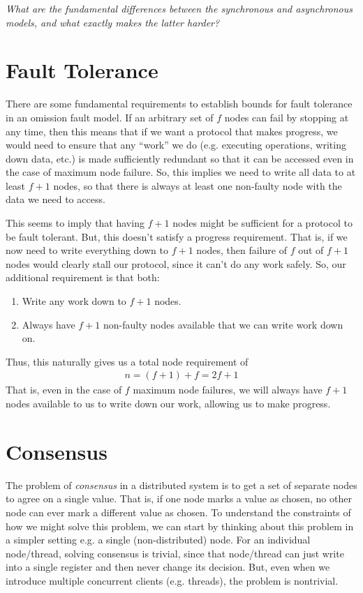 \documentclass[10pt,a4paper]{article}
\begin{document}
\textit{What are the fundamental differences between the synchronous and asynchronous models, and what exactly makes the latter harder?}

\section{Fault Tolerance}

There are some fundamental requirements to establish bounds for fault tolerance in an omission fault model. If an arbitrary set of $f$ nodes can fail by stopping at any time, then this means that if we want a protocol that makes progress, we would need to ensure that any ``work'' we do (e.g. executing operations, writing down data, etc.) is made sufficiently redundant so that it can be accessed even in the case of maximum node failure. So, this implies we need to write all data to at least $f+1$ nodes, so that there is always at least one non-faulty node with the data we need to access. 

This seems to imply that having $f+1$ nodes might be sufficient for a protocol to be fault tolerant. But, this doesn't satisfy a progress requirement. That is, if we now need to write everything down to $f+1$ nodes, then failure of $f$ out of $f+1$ nodes would clearly stall our protocol, since it can't do any work safely. So, our additional requirement is that both: 
\begin{enumerate}[1)]
    \item Write any work down to $f+1$ nodes.
    \item Always have $f+1$ non-faulty nodes available that we can write work down on.
\end{enumerate}
Thus, this naturally gives us a total node requirement of 
\begin{align*}
    n = (f+1) + f = 2f + 1
\end{align*}
That is, even in the case of $f$ maximum node failures, we will always have $f+1$ nodes available to us to write down our work, allowing us to make progress.

\section{Consensus}

The problem of \textit{consensus} in a distributed system is to get a set of separate nodes to agree on a single value. That is, if one node marks a value as chosen, no other node can ever mark a different value as chosen. To understand the constraints of how we might solve this problem, we can start by thinking about this problem in a simpler setting e.g. a single (non-distributed) node. For an individual node/thread, solving consensus is trivial, since that node/thread can just write into a single register and then never change its decision. But, even when we introduce multiple concurrent clients (e.g. threads), the problem is nontrivial. 
\end{document}
